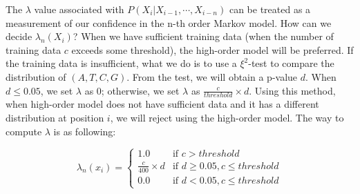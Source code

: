 \documentclass[12pt]{article} %
\begin{document}
The $\lambda$ value associated with $P(X_i | X_{i-1}, \cdots, X_{i-n})$ can be treated as a measurement of our confidence in the n-th order Markov model. How can we decide $\lambda_n(X_i)$? When we have sufficient training data (when the number of training data $c$ exceeds some threshold), the high-order model will be preferred. If the training data is insufficient, what we do is to use a $\xi^2$-test to compare the distribution of $(A, T, C, G)$. From the test, we will obtain a p-value $d$. When $d \le 0.05$, we set $\lambda$ as $0$; otherwise, we set $\lambda$ as $\frac{c}{threshold} \times d$. Using this method, when high-order model does not have sufficient data and it has a different distribution at position $i$, we will reject using the high-order model. The way to compute $\lambda$ is as following:

\begin{equation}
\lambda_n(x_i) = 
\begin{cases}
1.0	& \text{if } c > threshold \\
\frac{c}{400} \times d & \text{if } d \ge 0.05, c \le threshold\\
0.0 & \text{if } d < 0.05, c \le threshold
\end{cases}
\end{equation}
\end{document}
